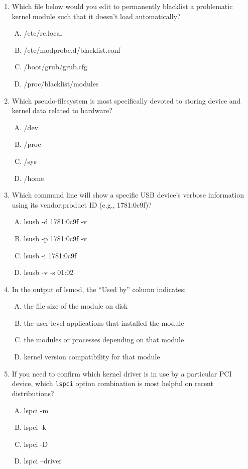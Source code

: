 \documentclass[12pt,a4paper]{report}
\begin{document}
\begin{enumerate}[1.]
\item Which file below would you edit to permanently blacklist a problematic kernel module such that it doesn’t load automatically?
  \begin{enumerate}[A)]
    \item /etc/rc.local
    \item /etc/modprobe.d/blacklist.conf
    \item /boot/grub/grub.cfg
    \item /proc/blacklist/modules
  \end{enumerate}

\item Which pseudo-filesystem is most specifically devoted to storing device and kernel data related to hardware?
  \begin{enumerate}[A)]
    \item /dev
    \item /proc
    \item /sys
    \item /home
  \end{enumerate}

\item Which command line will show a specific USB device’s verbose information using its vendor:product ID (e.g., 1781:0c9f)?
  \begin{enumerate}[A)]
    \item lsusb -d 1781:0c9f -v
    \item lsusb -p 1781:0c9f -v
    \item lsusb -i 1781:0c9f
    \item lsusb -v -s 01:02
  \end{enumerate}

\item In the output of lsmod, the “Used by” column indicates:
  \begin{enumerate}[A)]
    \item the file size of the module on disk
    \item the user-level applications that installed the module
    \item the modules or processes depending on that module
    \item kernel version compatibility for that module
  \end{enumerate}

\item If you need to confirm which kernel driver is in use by a particular PCI device, which \texttt{lspci} option combination is most helpful on recent distributions?
  \begin{enumerate}[A)]
    \item lspci -m
    \item lspci -k
    \item lspci -D
    \item lspci --driver
  \end{enumerate}


\end{enumerate}
\end{document}
